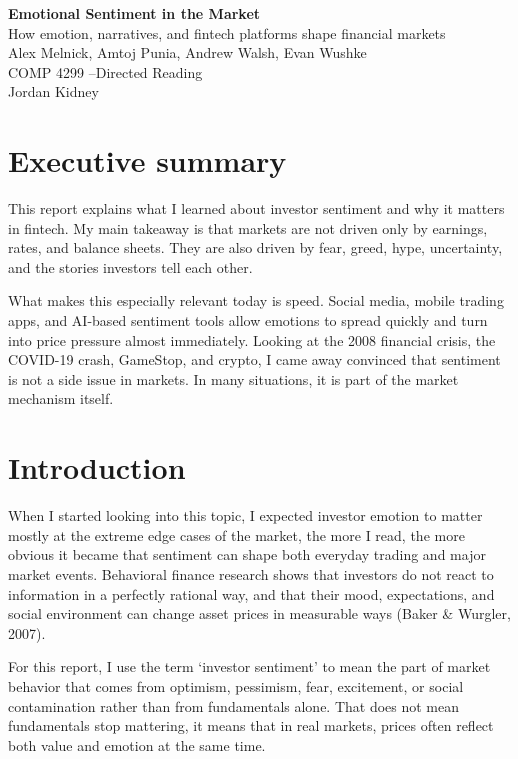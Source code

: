 \documentclass[12pt]{article}
\begin{document}
\begin{center}
{\LARGE \textbf{Emotional Sentiment in the Market}}\\[0.5em]
{\large How emotion, narratives, and fintech platforms shape financial markets}\\[1em]
Alex Melnick, Amtoj Punia, Andrew Walsh, Evan Wushke \\
COMP 4299 --Directed Reading\\
Jordan Kidney
\end{center}

\section*{Executive summary}

This report explains what I learned about investor sentiment and why it matters in fintech. My main takeaway is that markets are not driven only by earnings, rates, and balance sheets. They are also driven by fear, greed, hype, uncertainty, and the stories investors tell each other.

What makes this especially relevant today is speed. Social media, mobile trading apps, and AI-based sentiment tools allow emotions to spread quickly and turn into price pressure almost immediately. Looking at the 2008 financial crisis, the COVID-19 crash, GameStop, and crypto, I came away convinced that sentiment is not a side issue in markets. In many situations, it is part of the market mechanism itself.

\section{Introduction}

When I started looking into this topic, I expected investor emotion to matter mostly at the extreme edge cases of the market, the more I read, the more obvious it became that sentiment can shape both everyday trading and major market events. Behavioral finance research shows that investors do not react to information in a perfectly rational way, and that their mood, expectations, and social environment can change asset prices in measurable ways (Baker \& Wurgler, 2007).

For this report, I use the term `investor sentiment' to mean the part of market behavior that comes from optimism, pessimism, fear, excitement, or social contamination rather than from fundamentals alone. That does not mean fundamentals stop mattering, it means that in real markets, prices often reflect both value and emotion at the same time.
\end{document}
